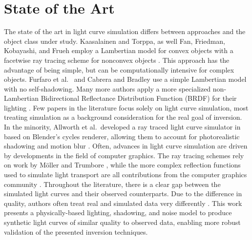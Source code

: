\section{State of the Art}

The state of the art in light curve simulation differs between approaches and the object class under study. Kaasalainen and Torppa, as well Fan, Friedman, Kobayashi, and Frueh employ a Lambertian model for convex objects with a facetwise ray tracing scheme for nonconvex objects \cite{kaasalainen2001, fan2016, fan2020thesis,friedman2020,kobayashi2020,frueh2014}. This approach has the advantage of being simple, but can be computationally intensive for complex objects. Furfaro et al.\ \cite{furfaro2019} and Cabrera and Bradley \cite{cabrera2021,bradley2014} use a simple Lambertian model with no self-shadowing. Many more authors apply a more specialized non-Lambertian Bidirectional Reflectance Distribution Function (BRDF) for their lighting \cite{linares2018space, mcnally2021, blacketer2022}. Few papers in the literature focus solely on light curve simulation, most treating simulation as a background consideration for the real goal of inversion. In the minority, Allworth et al.\ developed a ray traced light curve simulator in based on Blender's cycles renderer, allowing them to account for photorealistic shadowing and motion blur \cite{allworth2020, allworth2021}. Often, advances in light curve simulation are driven by developments in the field of computer graphics. The ray tracing schemes rely on work by Möller and Trumbore \cite{moller2005}, while the more complex reflection functions used to simulate light transport are all contributions from the computer graphics community \cite{phong1975, ashikhmin2000, cook1982, oren1994, matusik2003}. Throughout the literature, there is a clear gap between the simulated light curves and their observed counterparts. Due to the difference in quality, authors often treat real and simulated data very differently \cite{allworth2021}. This work presents a physically-based lighting, shadowing, and noise model to produce synthetic light curves of similar quality to observed data, enabling more robust validation of the presented inversion techniques.

